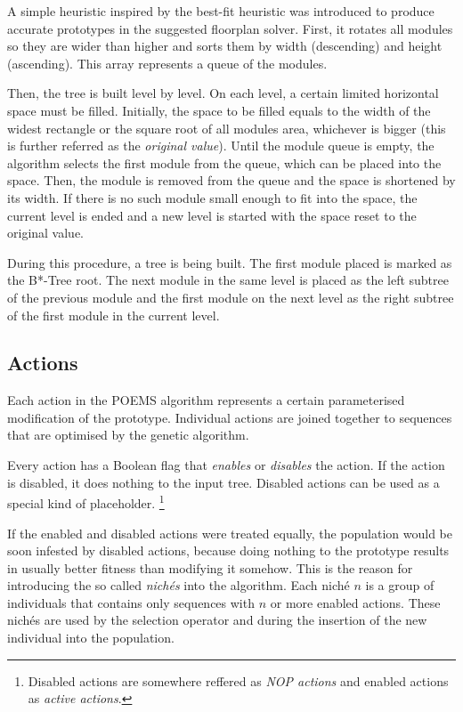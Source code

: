 A simple heuristic inspired by the best-fit heuristic was introduced to produce accurate prototypes in the suggested floorplan solver. First, it rotates all modules so they are wider than higher and sorts them by width (descending) and height (ascending). This array represents a queue of the modules. 

Then, the tree is built level by level. On each level, a certain limited horizontal space must be filled. Initially, the space to be filled equals to the width of the widest rectangle or the square root of all modules area, whichever is bigger (this is further referred as the {\em original value}). Until the module queue is empty, the algorithm selects the first module from the queue, which can be placed into the space. Then, the module is removed from the queue and the space is shortened by its width. If there is no such module small enough to fit into the space, the current level is ended and a new level is started with the space reset to the original value. 

During this procedure, a tree is being built. The first module placed is marked as the B*-Tree root. The next module in the same level is placed as the left subtree of the previous module and the first module on the next level as the right subtree of the first module in the current level.

\subsection{Actions}

Each action in the POEMS algorithm \cite{poems} represents a certain parameterised modification of the prototype. Individual actions are joined together to sequences that are optimised by the genetic algorithm. 

Every action has a Boolean flag that {\em enables} or {\em disables} the action. If the action is disabled, it does nothing to the input tree. Disabled actions can be used as a special kind of placeholder. \footnote{Disabled actions are somewhere reffered as {\em NOP actions} and enabled actions as {\em active actions}.}

If the enabled and disabled actions were treated equally, the population would be soon infested by disabled actions, because doing nothing to the prototype results in usually better fitness than modifying it somehow. This is the reason for introducing the so called {\em nichés} into the algorithm. Each niché $n$ is a group of individuals that contains only sequences with $n$ or more enabled actions. These nichés are used by the selection operator and during the insertion of the new individual into the population.

